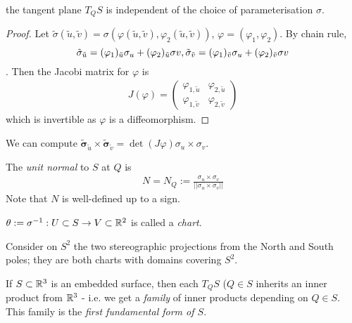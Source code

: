 \documentclass[a4paper]{article}
\begin{document}
\begin{coro}
the tangent plane $T_Q S$ is independent of the choice of parameterisation $\sigma$.
\begin{proof}
Let $\tilde{\sigma}(\tilde{u},\tilde{v}) = \sigma(\varphi(\tilde{u},\tilde{v}),\varphi_2(\tilde{u},\tilde{v}))$, $\varphi = (\varphi_1,\varphi_2)$. By chain rule, $$\tilde{\mathbf{\sigma}}_{\tilde{u}} =(\varphi_1)_{\tilde{u}} \mathbf{\sigma}_u + (\varphi_2)_{\tilde{u}}\mathbf{\sigma} v,\\ 
\tilde{\mathbf{\sigma}}_{\tilde{v}} =(\varphi_1)_{\tilde{v}} \mathbf{\sigma}_u + (\varphi_2)_{\tilde{v}}\mathbf{\sigma} v$$. Then the Jacobi matrix for $\varphi$ is
\begin{equation*}
\begin{aligned}
J(\varphi)=\left(\begin{matrix}
\varphi_{1,\tilde{u}} & \varphi_{2,\tilde{u}}\\
\varphi_{1,\tilde{v}} & \varphi_{2,\tilde{v}}
\end{matrix}\right)
\end{aligned}
\end{equation*}
which is invertible as $\varphi$ is a diffeomorphism.
\end{proof}
\end{coro}

\begin{rem}
We can compute $\tilde{\mathbf{\sigma}}_{\tilde{u}} \times \tilde{\mathbf{\sigma}}_{\tilde{v}} = \det(J\varphi) \sigma_u \times \sigma_v$.
\end{rem}

\begin{defi}
The \emph{unit normal} to $S$ at $Q$ is 
\begin{equation*}
\begin{aligned}
N = N_Q := \frac{\sigma_u \times \sigma_v}{||\sigma_u \times \sigma_v||}
\end{aligned}
\end{equation*}
Note that $N$ is well-defined up to a sign.

$\theta:= \sigma^{-1}: U \subset S \to V \subset \mathbb{R}^2$ is called a \emph{chart}.
\end{defi}

\begin{eg}
Consider on $S^2$ the two stereographic projections from the North and South poles; they are both charts with domains covering $S^2$.
\end{eg}

If $S \subset \mathbb{R}^3$ is an embedded surface, then each $T_Q S$ ($Q \in S$ inherits an inner product from $\mathbb{R}^3$ - i.e. we get a \emph{family} of inner products depending on $Q \in S$. This family is the \emph{first fundamental form of $S$}.
\end{document}
